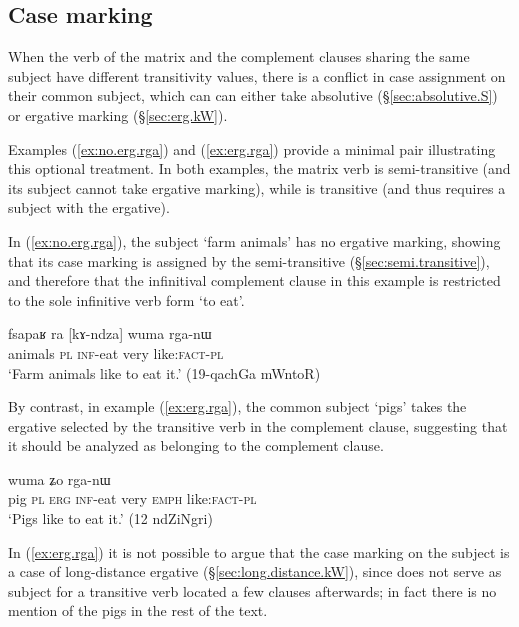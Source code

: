 \subsection{Case marking} \label{sec:complement.clause.case.marking}
When the verb of the matrix and the complement clauses sharing the same subject have different transitivity values, there is a conflict in case assignment on their common subject, which can can either take absolutive (§\ref{sec:absolutive.S}) or ergative marking (§\ref{sec:erg.kW}). 

Examples (\ref{ex:no.erg.rga}) and  (\ref{ex:erg.rga})  provide a minimal pair illustrating this optional treatment. In both examples, the matrix verb  is semi-transitive (and its subject cannot take ergative marking), while  is transitive (and thus requires a subject with the ergative).

In (\ref{ex:no.erg.rga}), the subject  `farm animals' has no ergative marking, showing that its case marking is assigned by the semi-transitive  (§\ref{sec:semi.transitive}), and therefore that the infinitival complement clause in this example is restricted to the sole infinitive verb form  `to eat'.

\begin{exe}
\ex \label{ex:no.erg.rga}
\gll fsapaʁ ra [kɤ-ndza] wuma rga-nɯ  \\
animals \textsc{pl}  \textsc{inf}-eat very  like:\textsc{fact}-\textsc{pl} \\
\glt `Farm animals like to eat it.' (19-qachGa mWntoR)
\end{exe}

By contrast, in example (\ref{ex:erg.rga}), the common subject   `pigs' takes the ergative  selected by the transitive verb   in the complement clause, suggesting that it should be analyzed as belonging to the complement clause.

\begin{exe}
\ex \label{ex:erg.rga}
 wuma ʑo rga-nɯ \\
pig \textsc{pl} \textsc{erg} \textsc{inf}-eat very \textsc{emph}  like:\textsc{fact}-\textsc{pl} \\
 \glt `Pigs like to eat it.' (12 ndZiNgri)
\end{exe}

In (\ref{ex:erg.rga}) it is not possible to argue that the case marking on the subject is a case of long-distance ergative (§\ref{sec:long.distance.kW}), since   does not serve as subject for a transitive verb located a few clauses afterwards; in fact there is no mention of the pigs in the rest of the text.


